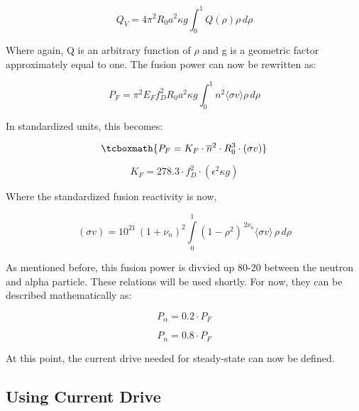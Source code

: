  \begin{equation}
  	\label{eq:qv}
 	Q_V = 4 \pi^2 R_0 a^2 \kappa g \int_0^1 Q(\rho) \rho \, d\rho
 \end{equation}
 
 Where again, Q is an arbitrary function of $\rho$ and g is a geometric factor approximately equal to one. The fusion power can now be rewritten as:
 
 \begin{equation}
 	P_F = \pi^2 E_F f_D^2 R_0 a^2 \kappa g \int_0^1 n^2 \langle \sigma v \rangle \rho \, d\rho
 \end{equation}
 
 In standardized units, this becomes:
 
\begin{equation}
	\label{eq:pf}
	\tcboxmath{
	P_F = K_F \cdot \overline{n}^2 \cdot R_0^3  \cdot (\sigma v)
	}
\end{equation}

\begin{equation}
  K_F = 278.3 \cdot f_D^2 \cdot ( \epsilon^2 \kappa g )
\end{equation}

Where the standardized fusion reactivity is now,

\begin{equation}
   (\sigma v) = 10^{21} \, (1+\nu_n)^2 \int\limits_0^1 ( 1 - \rho^2 ) ^ { \, 2 \nu_n} \langle \sigma v \rangle \, \rho \, d\rho
\end{equation}

As mentioned before, this fusion power is divvied up 80-20 between the neutron and alpha particle. These relations will be used shortly. For now, they can be described mathematically as:

\begin{equation}
	P_\alpha = 0.2 \cdot P_F
\end{equation}

\begin{equation}
	P_n = 0.8 \cdot P_F
\end{equation}

At this point, the current drive needed for steady-state can now be defined.

\subsection{Using Current Drive}

